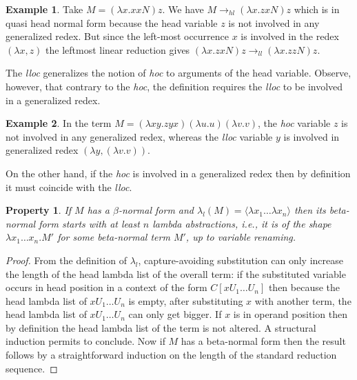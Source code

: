 \documentclass{elsarticle}
\makeatletter
\theoremstyle{plain}
\newtheorem{property}[theorem]{Property}
\theoremstyle{definition}
\newtheorem{example}{Example}[section]
\renewcommand\ie{{\it i.e.\@\xspace}}
\newcommand{\hlred}{\rightarrow_{hl}}
\newcommand{\llred}{\rightarrow_{ll}}
\makeatother
\begin{document}
\begin{example}
Take $M = (\lambda x. x x N) z$. We have $M \hlred (\lambda x. z x N) z$ which is in quasi head normal form because the head variable $z$ is not involved in any generalized redex.
But since the left-most occurrence $x$ is involved in the redex $(\lambda x, z)$ the leftmost linear reduction gives $(\lambda x. z x N) z \llred (\lambda x. z z N) z$.
\end{example}

The \emph{lloc} generalizes the notion of \emph{hoc} to arguments of the head variable. Observe, however, that contrary to the \emph{hoc}, the definition requires the \emph{lloc} to be involved in a generalized redex.
\begin{example}In the term $M = (\lambda x y . z y x) (\lambda u . u) (\lambda v . v)$, the \emph{hoc} variable $z$ is not involved in any generalized redex, whereas the \emph{lloc} variable $y$ is involved in generalized redex $(\lambda y, (\lambda v.v))$.
\end{example}
On the other hand, if the \emph{hoc} is involved in a generalized redex then by definition it must coincide with the \emph{lloc}.

\begin{property}
If $M$ has a $\beta$-normal form and $\lambda_l(M) = \langle \lambda x_1 \ldots \lambda x_n \rangle$ then its beta-normal form starts with at least $n$ lambda abstractions, \ie, it is of the shape $\lambda x_1 \ldots x_n . M'$ for some beta-normal term $M'$, up to variable renaming.
\end{property}
\begin{proof}
From the definition of $\lambda_l$, capture-avoiding substitution can only increase the length of the head lambda list of the overall term: if the substituted variable occurs in head position in a context of the form $C[x U_1 \ldots U_n]$ then because the head lambda list of $x U_1 \ldots U_n$ is empty, after substituting $x$ with another term, the head lambda list of $x U_1 \ldots U_n$ can only get bigger. If $x$ is in operand position then by definition the head lambda list of the term is not altered. A structural induction permits to conclude.
Now if $M$ has a beta-normal form then the result follows by a straightforward induction on the length of the standard reduction sequence.
\end{proof}
\end{document}
